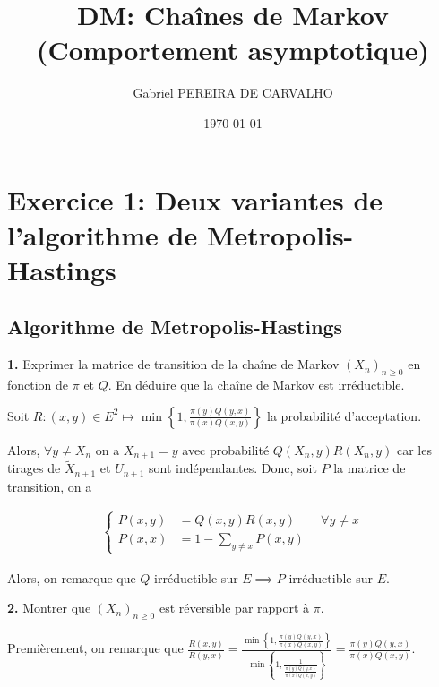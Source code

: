 \documentclass[french]{article}
\begin{document}
	\title{DM: Chaînes de Markov (Comportement asymptotique)}
	\author{Gabriel PEREIRA DE CARVALHO}
	\date{\today}
	
	\maketitle
	
	\section*{Exercice 1: Deux variantes de l'algorithme de Metropolis-Hastings}
	
	\subsection*{Algorithme de Metropolis-Hastings}
	
	\begin{tcolorbox}[colback=gray!5!white,colframe=gray!75!black]
		\textbf{1.} Exprimer la matrice de transition de la chaîne de Markov $(X_n)_{n \geq 0}$ en fonction de $\pi$ et $Q$. En déduire que la chaîne de Markov est irréductible.
	\end{tcolorbox}
	
	Soit $R: (x,y) \in E^2 \mapsto \min\left\{1, \frac{\pi(y) Q(y,x)}{\pi(x) Q(x,y)} \right\}$ la probabilité d'acceptation.
	
	Alors, $\forall y \not= X_n$ on a $X_{n+1} = y$ avec probabilité $Q(X_n, y)R(X_n, y)$ car les tirages de $\tilde{X}_{n+1}$ et $U_{n+1}$ sont indépendantes. Donc, soit $P$ la matrice de transition, on a
	
	\begin{align}
		\begin{cases}
		P(x, y) &= Q(x,y)R(x,y) \qquad \forall y \not=x \\
		P(x, x) &= 1 - \sum_{y \not= x} P(x,y)
		\end{cases}
	\end{align}
		
	 Alors, on remarque que $Q$ irréductible sur $E \implies P$ irréductible sur $E$. 
	
	\begin{tcolorbox}[colback=gray!5!white,colframe=gray!75!black]
		\textbf{2.} Montrer que $(X_n)_{n \geq 0}$ est réversible par rapport à $\pi$.
	\end{tcolorbox}

	Premièrement, on remarque que $\frac{R(x,y)}{R(y,x)} = \frac{\min\left\{1, \frac{\pi(y) Q(y,x)}{\pi(x) Q(x,y)} \right\}}{\min\left\{1, \frac{1}{\frac{\pi(y) Q(y,x)}{\pi(x) Q(x,y)}} \right\}}  = \frac{\pi(y) Q(y,x)}{\pi(x) Q(x, y)}$.
\end{document}
